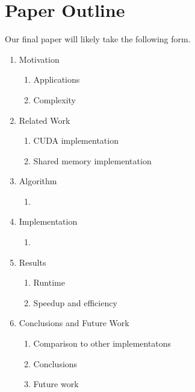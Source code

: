 \section{Paper Outline}

Our final paper will likely take the following form.

\begin{enumerate}[I]
\item Motivation
\begin{enumerate}[i]
\item Applications
\item Complexity
\end{enumerate}
\item Related Work
\begin{enumerate}[i]
\item CUDA implementation
\item Shared memory implementation
\end{enumerate}
\item Algorithm
\begin{enumerate}[i]
\item 
\end{enumerate}
\item Implementation
\begin{enumerate}[i]
\item
\end{enumerate}
\item Results
\begin{enumerate}[i]
\item Runtime
\item Speedup and efficiency
\end{enumerate}
\item Conclusions and Future Work
\begin{enumerate}[i]
\item Comparison to other implementatons
\item Conclusions
\item Future work
\end{enumerate}
\end{enumerate}

